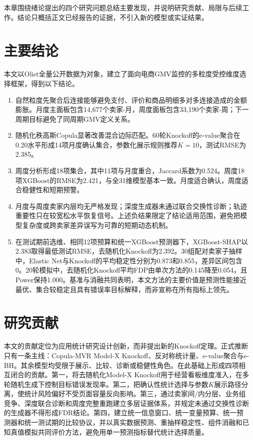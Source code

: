 \documentclass{sufethesismas}
\providecommand{\tightlist}{\setlength{\itemsep}{0pt}\setlength{\parskip}{0pt}}
\begin{document}
本章围绕绪论提出的四个研究问题总结主要发现，并说明研究贡献、局限与后续工作。结论只概括正文已经报告的证据，不引入新的模型或实证结果。

\section{主要结论}

本文以Olist全量公开数据为对象，建立了面向电商GMV监控的多粒度受控维度选择框架，得到以下结论。

\begin{enumerate}
\def\labelenumi{\arabic{enumi}.}
\tightlist
\item
  自然粒度先聚合后连接能够避免支付、评价和商品明细多对多连接造成的金额膨胀。月度主面板包含14,677个卖家-月，周度面板包含33,190个卖家-周；下一周期目标避免了同周期GMV定义关系。
\item
  随机化秩高斯Copula显著改善混合边际匹配。60轮Knockoff的e-value聚合在0.20水平形成14项月度确认集合，参数化展示规则推荐\(K=10\)，测试RMSE为2.385。
\item
  周度分析形成18项集合，其中11项与月度重合，Jaccard系数为0.524。周度18项XGBoost的RMSE为2.421，与全31维模型基本一致。月度适合确认，周度适合稳健性和短期预警。
\item
  月度与周度卖家内层均无严格发现；深度生成器未通过联合交换性诊断；轨迹重要性只在较宽松水平恢复信号。上述负结果限定了结论适用范围，避免把模型复杂度或跨卖家差异误写为可靠的短期动态机制。
\item
  在测试期前选维、相同12项预算和统一XGBoost预测器下，XGBoost-SHAP以2.383取得最低测试RMSE，去随机化Knockoff为2.392。30组配对卖家子抽样中，Elastic Net与Knockoff的平均稳定性分别为0.873和0.855，差异区间包含0。20轮模拟中，去随机化Knockoff平均FDP由单次方法的0.145降至0.054，且Power保持1.000。基准与消融共同表明，本文方法的主要价值是预测性能接近最优、集合较稳定且具有错误率目标解释，而非宣称在所有指标上领先。
\end{enumerate}

\section{研究贡献}

本文的贡献定位为应用统计研究设计创新，而非提出新的Knockoff定理。正式推断只有一条主线：Copula-MVR Model-X Knockoff、反对称统计量、e-value聚合与e-BH。其余模型均受限于展示、比较、诊断或稳健性角色。在此基础上形成四项相互闭合的贡献。第一，将去随机化Model-X Knockoff用于经营看板维度准入，在多轮随机生成下控制目标错误发现率。第二，把确认性统计选择与参数\(K\)展示路径分离，使统计风险偏好不受页面容量反向影响。第三，通过卖家间/内分层、业务组竞争、深度联合诊断和周度完整重跑建立多层证据体系，并规定未通过交换性诊断的生成器不得形成FDR结论。第四，建立统一信息窗口、统一变量预算、统一预测器和统一测试期的比较协议，并以真实数据预测、重抽样稳定性、组件消融和已知真值模拟共同评价方法，避免用单一预测指标替代统计选择质量。
\end{document}
